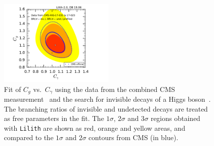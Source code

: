 \begin{figure}[t!]\centering
\includegraphics[width=0.5\textwidth]{validation/CMS/HIG-17-031-CgCGa_BRinvBRund_profiled.pdf}
\caption{Fit of $C_g$ vs.\ $C_\gamma$ using the data from the combined CMS measurement~\cite{Sirunyan:2018koj} and the 
search for invisible decays of a Higgs boson~\cite{Sirunyan:2018owy}. The branching ratios of invisible and undetected decays 
are treated as free parameters in the fit. 
The  $1\sigma$,  $2\sigma$ and $3\sigma$ regions obtained with {\tt Lilith} are shown as red, orange and yellow areas, 
and compared to the $1\sigma$ and $2\sigma$ contours from CMS (in blue).}
\label{fig:validation_cms_inv}
\end{figure}

